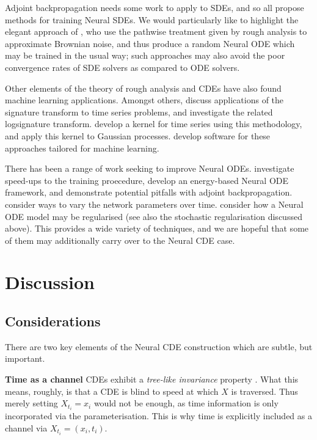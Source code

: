 \documentclass{article}
\theoremstyle{plain}
\theoremstyle{definition}
\newcommand{\boldheading}[1]{

\textbf{#1}\quad}
\begin{document}
	Adjoint backpropagation needs some work to apply to SDEs, and so \cite{scalable-sde, nsde-basic, roughstochasticNF} all propose methods for training Neural SDEs. We would particularly like to highlight the elegant approach of \cite{roughstochasticNF}, who use the pathwise treatment given by rough analysis to approximate Brownian noise, and thus produce a random Neural ODE which may be trained in the usual way; such approaches may also avoid the poor convergence rates of SDE solvers as compared to ODE solvers.

	Other elements of the theory of rough analysis and CDEs have also found machine learning applications. Amongst others, \cite{kidger2019deep, primer2016, PerezArribas2018different, fermanian2019embedding, morrill2019sepsis, jeremythesis, pathsig, generalisedsignature} discuss applications of the signature transform to time series problems, and \cite{logsig-rnn} investigate the related logsignature transform. \cite{kiraly2019kernels} develop a kernel for time series using this methodology, and \cite{toth2019gp} apply this kernel to Gaussian processes. \cite{signatory} develop software for these approaches tailored for machine learning.
	
	There has been a range of work seeking to improve Neural ODEs. \cite{Quaglino2020SNODE, trainingnode} investigate speed-ups to the training proecedure, \cite{stable-neural-flows} develop an energy-based Neural ODE framework, and \cite{anode} demonstrate potential pitfalls with adjoint backpropagation. \cite{anode2, dissecting} consider ways to vary the network parameters over time. \cite{trainingnode, robust-node} consider how a Neural ODE model may be regularised (see also the stochastic regularisation discussed above). This provides a wide variety of techniques, and we are hopeful that some of them may additionally carry over to the Neural CDE case.
	
	\section{Discussion}
	\subsection{Considerations}
	There are two key elements of the Neural CDE construction which are subtle, but important.

	\boldheading{Time as a channel}
	CDEs exhibit a \emph{tree-like invariance} property \cite{hambly2010uniqueness}. What this means, roughly, is that a CDE is blind to speed at which $X$ is traversed. Thus merely setting $X_{t_i} = x_i$ would not be enough, as time information is only incorporated via the parameterisation. This is why time is explicitly included as a channel via $X_{t_i} = (x_i, t_i)$.
	
\end{document}
